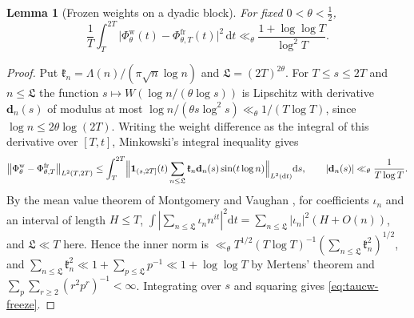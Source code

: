 \documentclass[11pt,a4paper]{article}
\numberwithin{equation}{section}
\newtheorem{lemma}[theorem]{Lemma}
\theoremstyle{definition}
\theoremstyle{remark}
\newcommand{\dd}{\,\mathrm dt}
\begin{document}
\begin{lemma}[Frozen weights on a dyadic block]\label{lem:taucw-freeze}
For fixed $0<\theta<\frac12$,
\begin{equation}\label{eq:taucw-freeze}
\frac1T\int_T^{2T}\bigl|\Phi^{\mathrm w}_\theta(t)-\Phi^{\mathrm{fr}}_{\theta,T}(t)\bigr|^2\dd\ll_\theta\frac{1+\log\log T}{\log^2T}.
\end{equation}
\end{lemma}
\begin{proof}
Put $\mathfrak k_n=\Lambda(n)/(\pi\sqrt n\log n)$ and $\mathfrak L=(2T)^{2\theta}$. For $T\le s\le2T$ and $n\le\mathfrak L$ the function $s\mapsto W(\log n/(\theta\log s))$ is Lipschitz with derivative $\mathbf d_n(s)$ of modulus at most $\log n/(\theta s\log^2s)\ll_\theta1/(T\log T)$, since $\log n\le2\theta\log(2T)$. Writing the weight difference as the integral of this derivative over $[T,t]$, Minkowski's integral inequality gives
\begin{equation}
\bigl\|\Phi^{\mathrm w}_\theta-\Phi^{\mathrm{fr}}_{\theta,T}\bigr\|_{L^2(T,2T)}\le\int_T^{2T}\Bigl\|\mathbf 1_{(s,2T]}(t)\sum_{n\le\mathfrak L}\mathfrak k_n\mathbf d_n(s)\sin(t\log n)\Bigr\|_{L^2(\mathrm dt)}\mathrm ds,\qquad|\mathbf d_n(s)|\ll_\theta\frac1{T\log T}.
\end{equation}
By the mean value theorem of Montgomery and Vaughan \cite{MontgomeryVaughan}, for coefficients $\iota_n$ and an interval of length $H\le T$, $\int|\sum_{n\le\mathfrak L}\iota_nn^{it}|^2\mathrm dt=\sum_{n\le\mathfrak L}|\iota_n|^2(H+O(n))$, and $\mathfrak L\ll T$ here. Hence the inner norm is $\ll_\theta T^{1/2}(T\log T)^{-1}(\sum_{n\le\mathfrak L}\mathfrak k_n^2)^{1/2}$, and
$\sum_{n\le\mathfrak L}\mathfrak k_n^2\ll1+\sum_{p\le\mathfrak L}p^{-1}\ll1+\log\log T$ by Mertens' theorem and $\sum_p\sum_{r\ge2}(r^2p^r)^{-1}<\infty$. Integrating over $s$ and squaring gives \eqref{eq:taucw-freeze}.
\end{proof}
\end{document}
